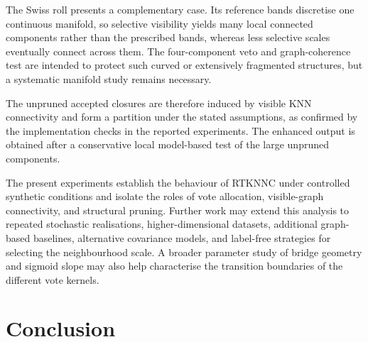 \documentclass[review,12pt]{elsarticle}
\begin{document}
The Swiss roll presents a complementary case. Its reference bands discretise
one continuous manifold, so selective visibility yields many local connected
components rather than the prescribed bands, whereas less selective scales
eventually connect across them. The four-component veto and graph-coherence
test are intended to protect such curved or extensively fragmented structures,
but a systematic manifold study remains necessary.

The unpruned accepted closures are therefore induced by visible KNN
connectivity and form a partition under the stated assumptions, as
confirmed by the implementation checks in the reported experiments. The enhanced output is obtained after a
conservative local model-based test of the large unpruned components.

The present experiments establish the behaviour of RTKNNC under controlled
synthetic conditions and isolate the roles of vote allocation, visible-graph
connectivity, and structural pruning. Further work may extend this analysis to
repeated stochastic realisations, higher-dimensional datasets, additional
graph-based baselines, alternative covariance models, and label-free
strategies for selecting the neighbourhood scale. A broader parameter study
of bridge geometry and sigmoid slope may also help characterise the transition
boundaries of the different vote kernels.

\section{Conclusion}\label{sec:conclusion}
\end{document}
